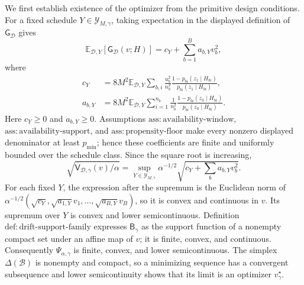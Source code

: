 We first establish existence of the optimizer from the primitive design conditions.  For a fixed schedule \(Y\in\mathcal Y_{M,\gamma}\), taking expectation in the displayed definition of \(\mathsf G_{\mathcal D}\) gives
\[
\mathbb E_{\mathcal D,Y}[\mathsf G_{\mathcal D}(v;H)]
=c_Y+\sum_{b=1}^Ba_{b,Y}v_b^2,
\]
where
\[
\begin{aligned}
c_Y&=8M^2\mathbb E_{\mathcal D,Y}
 \sum_{b,i}\frac{u_b^2}{n_b^2}
 \frac{1-p_{bi}(z_1\mid H_{bi})}{p_{bi}(z_1\mid H_{bi})},\\
a_{b,Y}&=8M^2\mathbb E_{\mathcal D,Y}
 \sum_{i=1}^{n_b}\frac1{n_b^2}
 \frac{1-p_{bi}(z_0\mid H_{bi})}{p_{bi}(z_0\mid H_{bi})}.
\end{aligned}
\]
Here \(c_Y\ge0\) and \(a_{b,Y}\ge0\).  Assumptions \(\mathrm{ass:availability\text{-}window}\), \(\mathrm{ass:availability\text{-}support}\), and \(\mathrm{ass:propensity\text{-}floor}\) make every nonzero displayed denominator at least \(p_{\min}\); hence these coefficients are finite and uniformly bounded over the schedule class.  Since the square root is increasing,
\[
\sqrt{\overline{\mathsf V}_{\mathcal D,\gamma}(v)/\alpha}
=\sup_{Y\in\mathcal Y_{M,\gamma}}
 \alpha^{-1/2}\sqrt{c_Y+\sum_ba_{b,Y}v_b^2}.
\]
For each fixed \(Y\), the expression after the supremum is the Euclidean norm of
\(\alpha^{-1/2}(\sqrt{c_Y},\sqrt{a_{1,Y}}v_1,\ldots,\sqrt{a_{B,Y}}v_B)\), so it is convex and continuous in \(v\).  Its supremum over \(Y\) is convex and lower semicontinuous.  Definition \(\mathrm{def:drift\text{-}support\text{-}family}\) expresses \(\mathsf B_\gamma\) as the support function of a nonempty compact set under an affine map of \(v\); it is finite, convex, and continuous.  Consequently \(\Psi_{\alpha,\gamma}\) is finite, convex, and lower semicontinuous.  The simplex \(\Delta(\mathcal B)\) is nonempty and compact, so a minimizing sequence has a convergent subsequence and lower semicontinuity shows that its limit is an optimizer \(v_\gamma^\star\).

